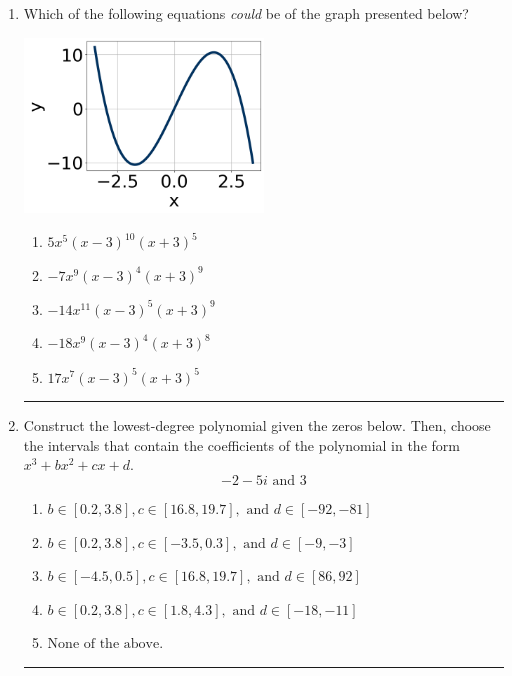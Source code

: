 \documentclass[14pt]{extbook}
\newcommand{\litem}[1]{\item#1\hspace*{-1cm}\rule{\textwidth}{0.4pt}}
\begin{document}
\begin{enumerate}
{\begin{enumerate}[label=\Alph*.]
\end{enumerate} }
\litem{
Which of the following equations \textit{could} be of the graph presented below?
\begin{center}
    \includegraphics[width=0.5\textwidth]{../Figures/polyGraphToFunctionA.png}
\end{center}
\begin{enumerate}[label=\Alph*.]
\item \( 5x^{5} (x - 3)^{10} (x + 3)^{5} \)
\item \( -7x^{9} (x - 3)^{4} (x + 3)^{9} \)
\item \( -14x^{11} (x - 3)^{5} (x + 3)^{9} \)
\item \( -18x^{9} (x - 3)^{4} (x + 3)^{8} \)
\item \( 17x^{7} (x - 3)^{5} (x + 3)^{5} \)

\end{enumerate} }
\litem{
Construct the lowest-degree polynomial given the zeros below. Then, choose the intervals that contain the coefficients of the polynomial in the form $x^3+bx^2+cx+d$.\[ -2 - 5 i \text{ and } 3 \]\begin{enumerate}[label=\Alph*.]
\item \( b \in [0.2, 3.8], c \in [16.8, 19.7], \text{ and } d \in [-92, -81] \)
\item \( b \in [0.2, 3.8], c \in [-3.5, 0.3], \text{ and } d \in [-9, -3] \)
\item \( b \in [-4.5, 0.5], c \in [16.8, 19.7], \text{ and } d \in [86, 92] \)
\item \( b \in [0.2, 3.8], c \in [1.8, 4.3], \text{ and } d \in [-18, -11] \)
\item \( \text{None of the above.} \)


\end{enumerate}}
\end{enumerate}
\end{document}
